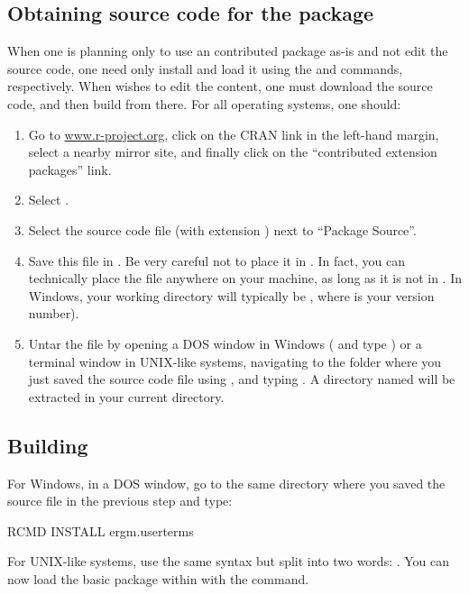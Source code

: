 \documentclass[nojss]{jss}
\begin{document}
\subsection[Obtaining source code for the ergm.userterms package]{Obtaining source code for the  package}
\label{Source}

When one is planning only to use an  contributed package as-is and
not edit the source code, one need only install and load it using the  and  commands, respectively.
When wishes to edit the content, one must download the source code,
and then build from there. For all operating systems, one should:
\begin{enumerate}
\item Go to \url{www.r-project.org}, click on the CRAN link in the left-hand margin,
select a nearby mirror site, and finally click on the ``contributed extension packages''
link.
\item Select .
\item Select the source code file (with extension ) next to ``Package Source''.
\item Save this file in .  Be very careful not to place it in . In fact, you can technically place the file anywhere on your machine, as long as it is not in .  In Windows, your  working directory will typically be , where  is your  version number).
\item Untar the file by opening a DOS window in
Windows ( and type ) or a terminal window in
UNIX-like systems,
navigating to the folder where you just saved the source code file
using , and typing .
A directory named  will be extracted in your current directory.
\end{enumerate}

\subsection[Building ergm.userterms]{Building }
\label{BuildEUT}

For Windows, in a DOS window, go to the same directory where you saved the  source file in the previous step and type:
\begin{CodeChunk}
\begin{CodeInput}
RCMD INSTALL ergm.userterms
\end{CodeInput}
\end{CodeChunk}
For UNIX-like systems, use the same syntax but split 
into two words: .
You can now load the basic  package within  with the  command.
\end{document}
